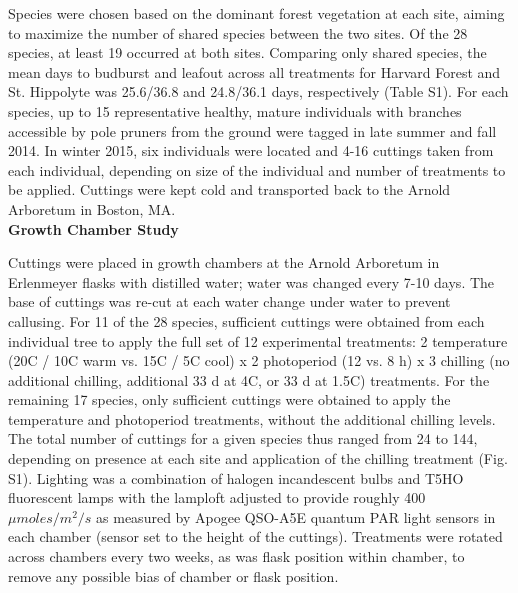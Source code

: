 \documentclass[11pt]{article}
\begin{document}
Species were chosen based on the dominant forest vegetation at each site, aiming to maximize the number of shared species between the two sites. Of the 28 species, at least 19 occurred at both sites. Comparing only shared species, the mean days to budburst and leafout across all treatments for Harvard Forest and St. Hippolyte was 25.6/36.8 and 24.8/36.1 days, respectively (Table S1). For each species, up to 15 representative healthy, mature individuals with branches accessible by pole pruners from the ground were tagged in late summer and fall 2014. In winter 2015, six individuals were located and 4-16 cuttings taken from each individual, depending on size of the individual and number of treatments to be applied. Cuttings were kept cold and transported back to the Arnold Arboretum in Boston, MA.
\vspace{1ex}\\
\noindent \textbf{Growth Chamber Study}

\noindent Cuttings were placed in growth chambers at the Arnold Arboretum in Erlenmeyer flasks with distilled water; water was changed every 7-10 days. The base of cuttings was re-cut at each water change under water to prevent callusing. For 11 of the 28 species, sufficient cuttings were obtained from each individual tree to apply the full set of 12 experimental treatments: 2 temperature (20\degree C / 10\degree C warm vs. 15\degree C / 5\degree C cool) x 2 photoperiod (12 vs. 8 h) x 3 chilling (no additional chilling,  additional 33 d at 4\degree C, or 33 d at 1.5\degree C) treatments. For the remaining 17 species, only sufficient cuttings were obtained to apply the temperature and photoperiod treatments, without the additional chilling levels. The total number of cuttings for a given species thus ranged from 24 to 144, depending on presence at each site and application of the chilling treatment (Fig. S1). Lighting was a combination of halogen incandescent bulbs and T5HO fluorescent lamps with the lamploft adjusted to provide roughly 400 $\mu moles/m^{2}/s$ as measured by Apogee QSO-A5E quantum PAR light sensors in each chamber (sensor set to the height of the cuttings). Treatments were rotated across chambers every two weeks, as was flask position within chamber, to remove any possible bias of chamber or flask position.
\end{document}
